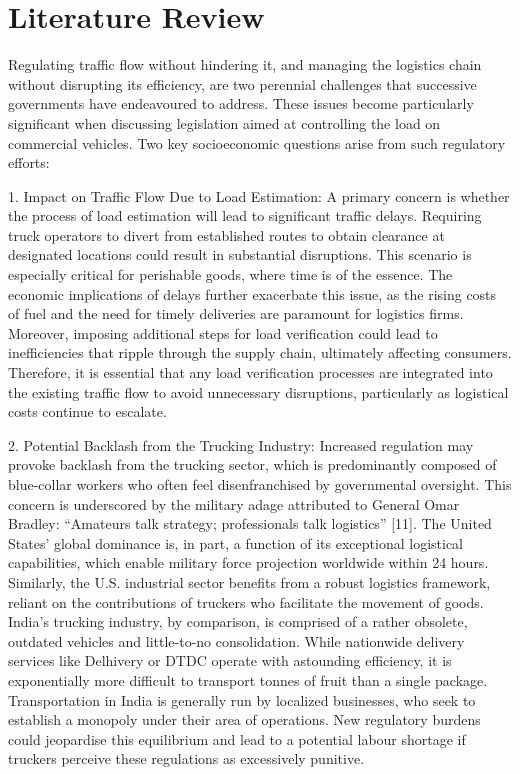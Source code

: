 \section{Literature Review}
Regulating traffic flow without hindering it, and managing the logistics chain without disrupting its efficiency, are two perennial challenges that successive governments have endeavoured to address. These issues become particularly significant when discussing legislation aimed at controlling the load on commercial vehicles. Two key socioeconomic questions arise from such regulatory efforts:

\vspace{0.5\baselineskip}

1. Impact on Traffic Flow Due to Load Estimation: A primary concern is whether the process of load estimation will lead to significant traffic delays. Requiring truck operators to divert from established routes to obtain clearance at designated locations could result in substantial disruptions. This scenario is especially critical for perishable goods, where time is of the essence. The economic implications of delays further exacerbate this issue, as the rising costs of fuel and the need for timely deliveries are paramount for logistics firms. Moreover, imposing additional steps for load verification could lead to inefficiencies that ripple through the supply chain, ultimately affecting consumers. Therefore, it is essential that any load verification processes are integrated into the existing traffic flow to avoid unnecessary disruptions, particularly as logistical costs continue to escalate. 

2. Potential Backlash from the Trucking Industry: 
Increased regulation may provoke backlash from the trucking sector, which is predominantly composed of blue-collar workers who often feel disenfranchised by governmental oversight. This concern is underscored by the military adage attributed to General Omar Bradley: “Amateurs talk strategy; professionals talk logistics” [11]. The United States' global dominance is, in part, a function of its exceptional logistical capabilities, which enable military force projection worldwide within 24 hours. Similarly, the U.S. industrial sector benefits from a robust logistics framework, reliant on the contributions of truckers who facilitate the movement of goods. India's trucking industry, by comparison, is comprised of a rather obsolete, outdated vehicles and little-to-no consolidation. While nationwide delivery services like Delhivery or DTDC operate with astounding efficiency, it is exponentially more difficult to transport tonnes of fruit than a single package. Transportation in India is generally run by localized businesses, who seek to establish a monopoly under their area of operations. New regulatory burdens could jeopardise this equilibrium and lead to a potential labour shortage if truckers perceive these regulations as excessively punitive. 

